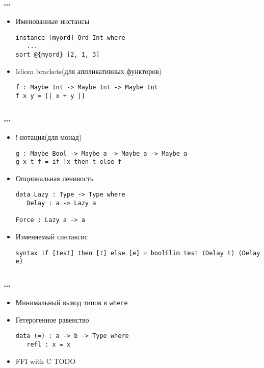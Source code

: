 \begin{frame}[fragile]
   \frametitle{\dots}
   \begin{itemize}
   \item Именованные инстансы
         \begin{lstlisting}
instance [myord] Ord Int where
   ...
sort @{myord} [2, 1, 3]
         \end{lstlisting}
   \item Idiom brackets(для аппликативных функторов)
         \begin{lstlisting}
f : Maybe Int -> Maybe Int -> Maybe Int
f x y = [| x + y |]
         \end{lstlisting}
   \end{itemize}
\end{frame}

\begin{frame}[fragile]
   \frametitle{\dots}
   \begin{itemize}
   \item !-нотация(для монад)
         \begin{lstlisting}
g : Maybe Bool -> Maybe a -> Maybe a -> Maybe a
g x t f = if !x then t else f
         \end{lstlisting}
   \item Опциональная ленивость
         \begin{lstlisting}
data Lazy : Type -> Type where
   Delay : a -> Lazy a

Force : Lazy a -> a
         \end{lstlisting}
   \item Изменяемый синтаксис
         \begin{lstlisting}
syntax if [test] then [t] else [e] = boolElim test (Delay t) (Delay e)
         \end{lstlisting}
   \end{itemize}
\end{frame}

\begin{frame}[fragile]
   \frametitle{\dots}
   \begin{itemize}
   \item Минимальный вывод типов в \texttt{\color{kwcolor}where}
   \item Гетерогенное равенство
      \begin{lstlisting}
data (=) : a -> b -> Type where
   refl : x = x
      \end{lstlisting}
   \item FFI with C
      TODO
   \end{itemize}
\end{frame}

